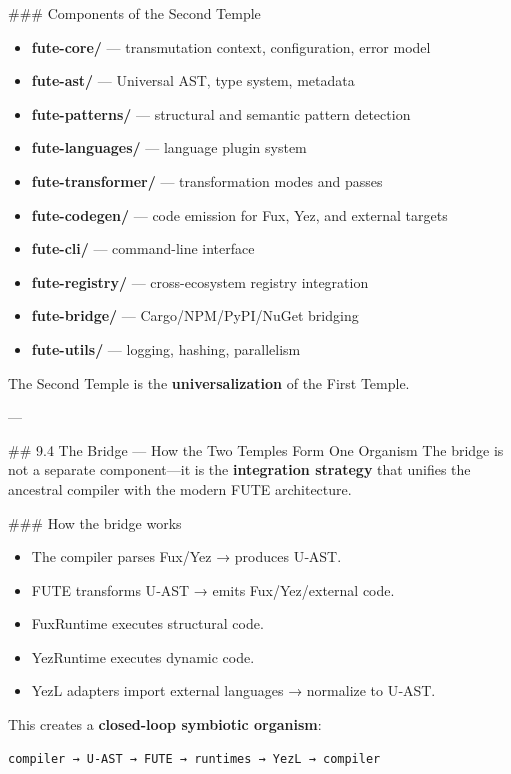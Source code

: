 \begin{enumerate}
\#\#\# Components of the Second Temple  
\begin{itemize}
  \item \textbf{fute-core/} — transmutation context, configuration, error model  
  \item \textbf{fute-ast/} — Universal AST, type system, metadata  
  \item \textbf{fute-patterns/} — structural and semantic pattern detection  
  \item \textbf{fute-languages/} — language plugin system  
  \item \textbf{fute-transformer/} — transformation modes and passes  
  \item \textbf{fute-codegen/} — code emission for Fux, Yez, and external targets  
  \item \textbf{fute-cli/} — command-line interface  
  \item \textbf{fute-registry/} — cross-ecosystem registry integration  
  \item \textbf{fute-bridge/} — Cargo/NPM/PyPI/NuGet bridging  
  \item \textbf{fute-utils/} — logging, hashing, parallelism  
\end{itemize}

The Second Temple is the \textbf{universalization} of the First Temple.

---

\#\# 9.4 The Bridge — How the Two Temples Form One Organism  
The bridge is not a separate component—it is the \textbf{integration strategy} that unifies the ancestral compiler with the modern FUTE architecture.

\#\#\# How the bridge works  
\begin{itemize}
  \item The compiler parses Fux/Yez → produces U‑AST.  
  \item FUTE transforms U‑AST → emits Fux/Yez/external code.  
  \item FuxRuntime executes structural code.  
  \item YezRuntime executes dynamic code.  
  \item YezL adapters import external languages → normalize to U‑AST.  
\end{itemize}

This creates a \textbf{closed-loop symbiotic organism}:

\begin{lstlisting}[language=fuxyez]
compiler → U-AST → FUTE → runtimes → YezL → compiler


\end{lstlisting}
\end{enumerate}
